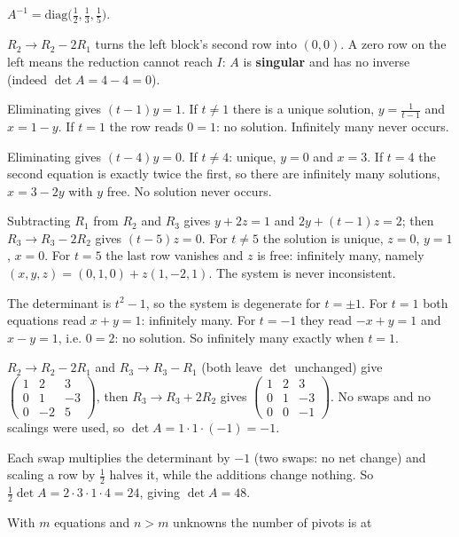 \begin{solutions}
        $A^{-1}=\mathrm{diag}\bigl(\tfrac12,\tfrac13,\tfrac15\bigr)$.
  \item $R_{2}\to R_{2}-2R_{1}$ turns the left block's second row into
        $(0,0)$. A zero row on the left means the reduction cannot reach
        $I$: $A$ is \textbf{singular} and has no inverse (indeed
        $\det A=4-4=0$).
  \item Eliminating gives $(t-1)y=1$. If $t\neq1$ there is a unique
        solution, $y=\tfrac{1}{t-1}$ and $x=1-y$. If $t=1$ the row reads
        $0=1$: no solution. Infinitely many never occurs.
  \item Eliminating gives $(t-4)y=0$. If $t\neq4$: unique, $y=0$ and
        $x=3$. If $t=4$ the second equation is exactly twice the first, so
        there are infinitely many solutions, $x=3-2y$ with $y$ free. No
        solution never occurs.
  \item Subtracting $R_{1}$ from $R_{2}$ and $R_{3}$ gives $y+2z=1$ and
        $2y+(t-1)z=2$; then $R_{3}\to R_{3}-2R_{2}$ gives $(t-5)z=0$. For
        $t\neq5$ the solution is unique, $z=0$, $y=1$, $x=0$. For $t=5$ the
        last row vanishes and $z$ is free: infinitely many, namely
        $(x,y,z)=(0,1,0)+z(1,-2,1)$. The system is never inconsistent.
  \item The determinant is $t^{2}-1$, so the system is degenerate for
        $t=\pm1$. For $t=1$ both equations read $x+y=1$: infinitely many.
        For $t=-1$ they read $-x+y=1$ and $x-y=1$, i.e. $0=2$: no
        solution. So infinitely many exactly when $t=1$.
  \item $R_{2}\to R_{2}-2R_{1}$ and $R_{3}\to R_{3}-R_{1}$ (both leave
        $\det$ unchanged) give
        $\begin{pmatrix}1&2&3\\0&1&-3\\0&-2&5\end{pmatrix}$, then
        $R_{3}\to R_{3}+2R_{2}$ gives
        $\begin{pmatrix}1&2&3\\0&1&-3\\0&0&-1\end{pmatrix}$. No swaps and
        no scalings were used, so $\det A=1\cdot1\cdot(-1)=-1$.
  \item Each swap multiplies the determinant by $-1$ (two swaps: no net
        change) and scaling a row by $\tfrac12$ halves it, while the
        additions change nothing. So
        $\tfrac12\det A=2\cdot3\cdot1\cdot4=24$, giving $\det A=48$.
  \item With $m$ equations and $n>m$ unknowns the number of pivots is at

\end{solutions}
